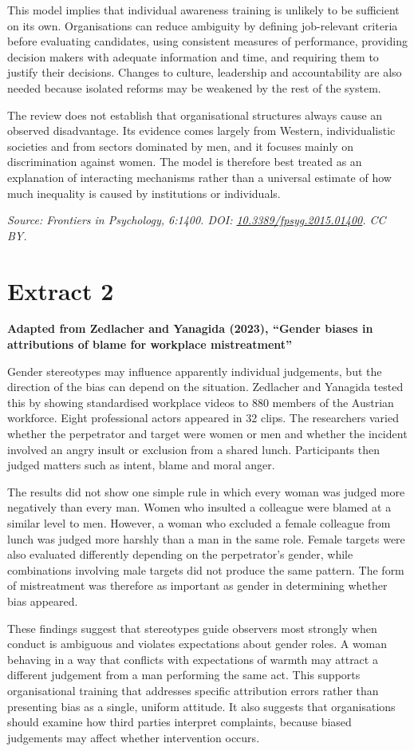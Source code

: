 \documentclass[11pt,a4paper]{article}
\newcommand{\sourceheading}[2]{%
  \section*{#1}
  \textbf{#2}\par\medskip
}
\begin{document}
This model implies that individual awareness training is unlikely to be sufficient on its own. Organisations can reduce ambiguity by defining job-relevant criteria before evaluating candidates, using consistent measures of performance, providing decision makers with adequate information and time, and requiring them to justify their decisions. Changes to culture, leadership and accountability are also needed because isolated reforms may be weakened by the rest of the system.

The review does not establish that organisational structures always cause an observed disadvantage. Its evidence comes largely from Western, individualistic societies and from sectors dominated by men, and it focuses mainly on discrimination against women. The model is therefore best treated as an explanation of interacting mechanisms rather than a universal estimate of how much inequality is caused by institutions or individuals.

\textit{Source: Frontiers in Psychology, 6:1400. DOI: \href{https://doi.org/10.3389/fpsyg.2015.01400}{10.3389/fpsyg.2015.01400}. CC BY.}

\newpage

\sourceheading{Extract 2}{Adapted from Zedlacher and Yanagida (2023), ``Gender biases in attributions of blame for workplace mistreatment''}

Gender stereotypes may influence apparently individual judgements, but the direction of the bias can depend on the situation. Zedlacher and Yanagida tested this by showing standardised workplace videos to 880 members of the Austrian workforce. Eight professional actors appeared in 32 clips. The researchers varied whether the perpetrator and target were women or men and whether the incident involved an angry insult or exclusion from a shared lunch. Participants then judged matters such as intent, blame and moral anger.

The results did not show one simple rule in which every woman was judged more negatively than every man. Women who insulted a colleague were blamed at a similar level to men. However, a woman who excluded a female colleague from lunch was judged more harshly than a man in the same role. Female targets were also evaluated differently depending on the perpetrator's gender, while combinations involving male targets did not produce the same pattern. The form of mistreatment was therefore as important as gender in determining whether bias appeared.

These findings suggest that stereotypes guide observers most strongly when conduct is ambiguous and violates expectations about gender roles. A woman behaving in a way that conflicts with expectations of warmth may attract a different judgement from a man performing the same act. This supports organisational training that addresses specific attribution errors rather than presenting bias as a single, uniform attitude. It also suggests that organisations should examine how third parties interpret complaints, because biased judgements may affect whether intervention occurs.
\end{document}
